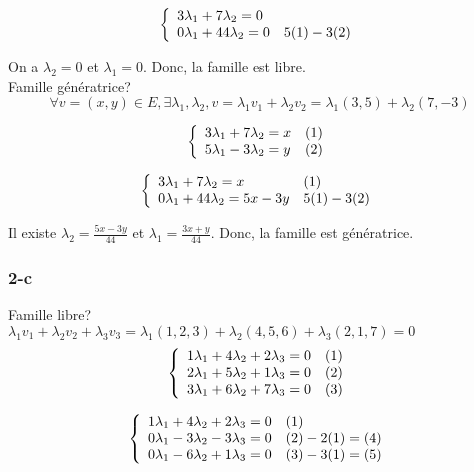 \documentclass[]{book}
\theoremstyle{definition}
\begin{document}
$$
\left\{ 
\begin{array}{l l}
3 \lambda_1 + 7 \lambda_2 = 0 & \\
0 \lambda_1 + 44 \lambda_2 = 0 & 5(1) - 3(2)\\
\end{array}
\right. 
$$ 

On a $\lambda_2 = 0$ et $\lambda_1 = 0$. Donc, la famille est libre. \\

Famille g\'en\'eratrice?
$$\forall v = (x,y) \in E, \exists \lambda_1, \lambda_2, v = \lambda_1 v_1 + \lambda_2 v_2 = \lambda_1 (3,5) + \lambda_2 (7,-3)$$


$$
\left\{ 
\begin{array}{l l}
3 \lambda_1 + 7 \lambda_2 = x & (1)\\
5 \lambda_1 - 3 \lambda_2 = y & (2)\\
\end{array}
\right. 
$$ 

$$
\left\{ 
\begin{array}{l l}
3 \lambda_1 + 7 \lambda_2 = x & (1)\\
0 \lambda_1 +44 \lambda_2 = 5x -3y & 5(1) -3(2)\\
\end{array}
\right. 
$$ 

Il existe $\lambda_2 = \frac{5x -3y}{44}$ et $\lambda_1 = \frac{3x + y}{44}$. Donc, la famille est g\'en\'eratrice.

\subsubsection*{2-c}
Famille libre? \\
$\lambda_1 v_1 + \lambda_2 v_2 + \lambda_3 v_3 = \lambda_1 (1,2,3) + \lambda_2 (4,5,6) + \lambda_3 (2,1,7)  = 0$
$$
\left\{ 
\begin{array}{l l}
1 \lambda_1 + 4 \lambda_2 + 2 \lambda_3 = 0 & (1)\\
2 \lambda_1 + 5 \lambda_2 + 1 \lambda_3 = 0 & (2)\\
3 \lambda_1 + 6 \lambda_2 + 7 \lambda_3 = 0 & (3)\\
\end{array}
\right. 
$$ 

$$
\left\{ 
\begin{array}{l l}
1 \lambda_1 + 4 \lambda_2 + 2 \lambda_3 = 0 & (1)\\
0 \lambda_1 - 3 \lambda_2 - 3 \lambda_3 = 0 & (2) - 2(1) = (4)\\
0 \lambda_1 - 6 \lambda_2 + 1 \lambda_3 = 0 & (3) - 3(1) = (5)\\
\end{array}
\right. 
$$ 
\end{document}
